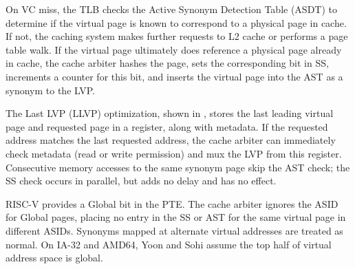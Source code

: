 On VC miss, the TLB checks the Active Synonym Detection Table (ASDT) to
determine if the virtual page is known to correspond to a physical page in
cache.  If not, the caching system makes further requests to L2 cache or
performs a page table walk.  If the virtual page ultimately does reference a
physical page already in cache, the cache arbiter hashes the page, sets the
corresponding bit in SS, increments a counter for this bit, and inserts the
virtual page into the AST as a synonym to the LVP.

The Last LVP (LLVP) optimization, shown in , stores the
last leading virtual page and requested page in a register, along with
metadata.  If the requested address matches the last requested address, the
cache arbiter can immediately check metadata (read or write permission) and mux
the LVP from this register.  Consecutive memory accesses to the same synonym
page skip the AST check; the SS check occurs in parallel, but adds no delay and
has no effect.

RISC-V provides a Global bit in the PTE.  The cache arbiter ignores the ASID
for Global pages, placing no entry in the SS or AST for the same virtual page
in different ASIDs.  Synonyms mapped at alternate virtual addresses are treated
as normal.  On IA-32 and AMD64, Yoon and Sohi assume the top half of virtual
address space is global.

